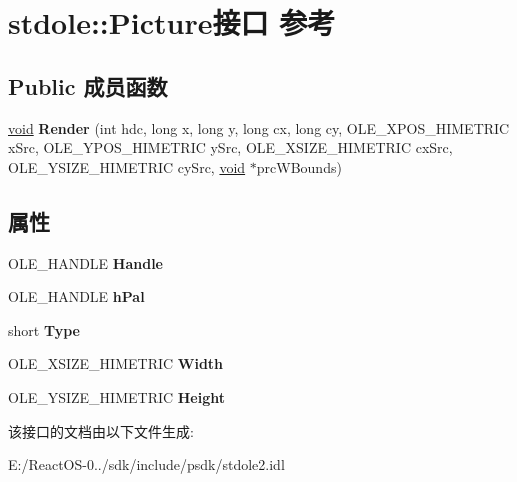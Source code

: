 \hypertarget{interfacestdole_1_1_picture}{}\section{stdole\+:\+:Picture接口 参考}
\label{interfacestdole_1_1_picture}
\subsection*{Public 成员函数}
\begin{DoxyCompactItemize}
\item 
\mbox{\label{interfacestdole_1_1_picture_a9e1d88391f366d8b895794516b12e857}} 
\hyperlink{interfacevoid}{void} {\bfseries Render} (int hdc, long x, long y, long cx, long cy, O\+L\+E\+\_\+\+X\+P\+O\+S\+\_\+\+H\+I\+M\+E\+T\+R\+IC x\+Src, O\+L\+E\+\_\+\+Y\+P\+O\+S\+\_\+\+H\+I\+M\+E\+T\+R\+IC y\+Src, O\+L\+E\+\_\+\+X\+S\+I\+Z\+E\+\_\+\+H\+I\+M\+E\+T\+R\+IC cx\+Src, O\+L\+E\+\_\+\+Y\+S\+I\+Z\+E\+\_\+\+H\+I\+M\+E\+T\+R\+IC cy\+Src, \hyperlink{interfacevoid}{void} $\ast$prc\+W\+Bounds)
\end{DoxyCompactItemize}
\subsection*{属性}
\begin{DoxyCompactItemize}
\item 
\mbox{\label{interfacestdole_1_1_picture_a079574cb0f2849e8f06e5227c4f728ff}} 
O\+L\+E\+\_\+\+H\+A\+N\+D\+LE {\bfseries Handle}
\item 
\mbox{\label{interfacestdole_1_1_picture_a91fe9d5a8a9866b34b4652f29bdae942}} 
O\+L\+E\+\_\+\+H\+A\+N\+D\+LE {\bfseries h\+Pal}
\item 
\mbox{\label{interfacestdole_1_1_picture_af29d4b65fe395ea493915880c3ce7527}} 
short {\bfseries Type}
\item 
\mbox{\label{interfacestdole_1_1_picture_a477c026726ce55e2de86216161382ac8}} 
O\+L\+E\+\_\+\+X\+S\+I\+Z\+E\+\_\+\+H\+I\+M\+E\+T\+R\+IC {\bfseries Width}
\item 
\mbox{\label{interfacestdole_1_1_picture_a5342b6360396edf9df0ec7badff6bad9}} 
O\+L\+E\+\_\+\+Y\+S\+I\+Z\+E\+\_\+\+H\+I\+M\+E\+T\+R\+IC {\bfseries Height}
\end{DoxyCompactItemize}


该接口的文档由以下文件生成\+:\begin{DoxyCompactItemize}
\item 
E\+:/\+React\+O\+S-\/0../sdk/include/psdk/stdole2.\+idl\end{DoxyCompactItemize}
